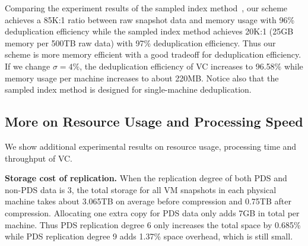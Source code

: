 

Comparing the experiment results of the sampled index method~\cite{Guo2011}, 
our scheme achieves a 85K:1 ratio between raw snapshot data and memory usage 
with 96\% deduplication efficiency
while the sampled index method achieves 20K:1 (25GB memory per 500TB raw data)
with 97\% deduplication efficiency.
Thus our scheme is more memory efficient with a good tradeoff for deduplication efficiency.
If we change $\sigma=4\%$, the deduplication efficiency of VC increases to 96.58\% while
memory usage per machine increases to about 220MB. 
Notice also that the sampled index method is designed for single-machine deduplication.


\subsection{More on Resource Usage and Processing Speed}

We show  additional experimental results on resource usage, processing time and throughput of VC.

{\bf Storage cost of replication.} 
When the replication degree of both PDS and non-PDS data is 3, 
the total storage  for all VM snapshots in each physical machine takes about 3.065TB on average before compression
and 0.75TB after compression.  Allocating  one extra  copy for PDS data only adds  7GB in total per machine.
Thus PDS replication degree 6 only increases the total space by 0.685\% while PDS replication degree 9 adds 1.37\% 
space overhead, which is still small.

